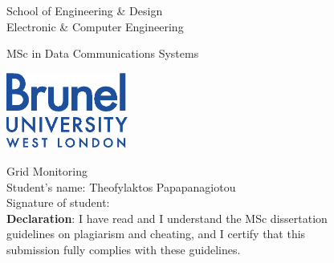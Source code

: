 \thispagestyle{empty}

\begin{center}
\Large
School of Engineering \& Design\\
Electronic \& Computer Engineering\\
\vspace{1\baselineskip}

MSc in Data Communications Systems\\
\vspace{1\baselineskip}

\begin{center}
\includegraphics[width=40mm]{images/brunel_logo.eps}\\
\end{center}
\vspace{0.5\baselineskip}

\Huge
Grid Monitoring\\
\vspace{2\baselineskip}
\Large
Student's name: Theofylaktos Papapanagiotou \\
Signature of student: \\

\vspace{1.8\baselineskip}
\large
{\bf Declaration}: I have read and I understand the MSc dissertation\\
guidelines on plagiarism and cheating, and I certify that this\\
submission fully complies with these guidelines.
\end{center}
\newpage
